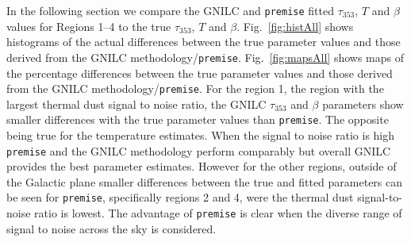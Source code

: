 \documentclass[a4paper,fleqn,usenatbib]{mnras}
\begin{document}
In the following section we compare the GNILC and {\texttt{premise}} fitted $\tau_{353}$, $T$ and $\beta$ values for Regions 1--4 to the true $\tau_{353}$, $T$ and $\beta$. Fig.~\ref{fig:histAll} shows histograms of the actual differences between the true parameter values and those derived from the GNILC methodology/{\texttt{premise}}. Fig.~\ref{fig:mapsAll} shows maps of the percentage differences between the true parameter values and those derived from the GNILC methodology/{\texttt{premise}}. For the region 1, the region with the largest thermal dust signal to noise ratio, the GNILC $\tau_{353}$ and $\beta$ parameters show smaller differences with the true parameter values than {\texttt{premise}}. The opposite being true for the temperature estimates. When the signal to noise ratio is high {\texttt{premise}} and the GNILC methodology perform comparably but overall GNILC provides the best parameter estimates. However for the other regions, outside of the Galactic plane smaller differences between the true and fitted parameters can be seen for {\texttt{premise}}, specifically regions 2 and 4, were the thermal dust signal-to-noise ratio is lowest. The advantage of {\texttt{premise}} is clear when the diverse range of signal to noise across the sky is considered. 
\end{document}
